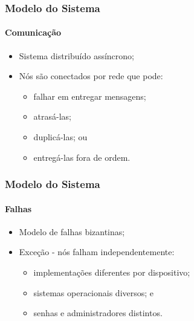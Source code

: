 \documentclass{beamer}
\begin{document}
\begin{frame}
  \frametitle{Modelo do Sistema}
  \framesubtitle{Comunicação}

  \begin{itemize}
    \item
      Sistema distribuído assíncrono;
      
      \pause
    \item
      Nós são conectados por rede que pode:
      \begin{itemize}
        \item
          falhar em entregar mensagens;

        \item
          atrasá-las;

        \item
          duplicá-las; ou

        \item
          entregá-las fora de ordem.
      \end{itemize}
  \end{itemize}

\end{frame}

\begin{frame}
  \frametitle{Modelo do Sistema}
  \framesubtitle{Falhas}

  \begin{itemize}
    \item
      Modelo de falhas bizantinas;
      
    \item
      Exceção - nós falham independentemente:
      \begin{itemize}
          \pause
        \item
          implementações diferentes por dispositivo;

          \pause
        \item
          sistemas operacionais diversos; e

          \pause
        \item
          senhas e administradores distintos.
      \end{itemize}
  \end{itemize}
\end{frame}
\end{document}
